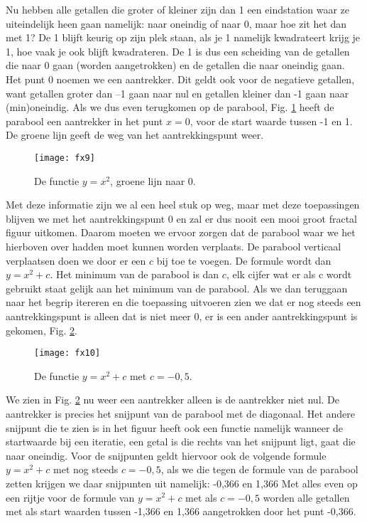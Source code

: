 \documentclass[11pt,fleqn]{book} %
\begin{document}
Nu hebben alle getallen die groter of kleiner zijn dan 1 een eindstation waar ze uiteindelijk heen gaan namelijk: naar oneindig of naar 0, maar hoe zit het dan met 1? De 1 blijft keurig op zijn plek staan, als je 1 namelijk kwadrateert krijg je 1, hoe vaak je ook blijft kwadrateren. De 1 is dus een scheiding van de getallen die naar 0 gaan (worden aangetrokken) en de getallen die naar oneindig gaan. Het punt 0 noemen we een aantrekker. Dit geldt ook voor de negatieve getallen, want getallen groter dan –1 gaan naar nul en getallen kleiner dan -1 gaan naar (min)oneindig. Als we dus even terugkomen op de parabool, Fig. \ref{fig:fx9} heeft de parabool een aantrekker in het punt $x=0$, voor de start waarde tussen -1 en 1. De groene lijn geeft de weg van het aantrekkingspunt weer.
\begin{figure}[h]
	\centering\texttt{[image: fx9]}
	\caption{De functie $y=x^2$, groene lijn naar 0.}
	\label{fig:fx9}
\end{figure}
Met deze informatie zijn we al een heel stuk op weg, maar met deze toepassingen blijven we met het aantrekkingspunt 0 en zal er dus nooit een mooi groot fractal figuur uitkomen. Daarom moeten we ervoor zorgen dat de parabool waar we het hierboven over hadden moet kunnen worden verplaats. De parabool verticaal verplaatsen doen we door er een $c$ bij toe te voegen. De formule wordt dan $y=x^2+c$. Het minimum van de parabool is dan $c$, elk cijfer wat er als c wordt gebruikt staat gelijk aan het minimum van de parabool. Als we dan teruggaan naar het begrip itereren en die toepassing uitvoeren zien we dat er nog steeds een aantrekkingspunt is alleen dat is niet meer 0, er is een ander aantrekkingspunt is gekomen, Fig. \ref{fig:fx10}.
\begin{figure}[h]
	\centering\texttt{[image: fx10]}
	\caption{De functie $y=x^2+c$ met $c=-0,5$.}
	\label{fig:fx10}
\end{figure}
We zien in Fig. \ref{fig:fx10} nu weer een aantrekker alleen is de aantrekker niet nul. De aantrekker is precies het snijpunt van de parabool met de diagonaal. Het andere snijpunt die te zien is in het figuur heeft ook een functie namelijk wanneer de startwaarde bij een iteratie, een getal is die rechts van het snijpunt ligt, gaat die naar oneindig. Voor de snijpunten geldt hiervoor ook de volgende formule $y=x^2+c$ met nog steeds $c=-0,5$, als we die tegen de formule van de parabool zetten krijgen we daar snijpunten uit namelijk: -0,366 en 1,366
Met alles even op een rijtje voor de formule van $y=x^2+c$ met als $c= -0,5$ worden alle getallen met als start waarden tussen -1,366 en 1,366 aangetrokken door het punt -0,366.
\end{document}
